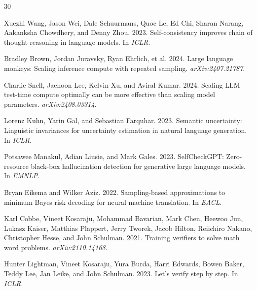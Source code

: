 \documentclass[11pt,a4paper]{article}
\begin{document}
\begin{thebibliography}{30}

Xuezhi Wang, Jason Wei, Dale Schuurmans, Quoc Le, Ed Chi, Sharan Narang, Aakanksha Chowdhery, and Denny Zhou. 2023.
\newblock Self-consistency improves chain of thought reasoning in language models.
\newblock In \emph{ICLR}.

Bradley Brown, Jordan Juravsky, Ryan Ehrlich, et al. 2024.
\newblock Large language monkeys: Scaling inference compute with repeated sampling.
\newblock \emph{arXiv:2407.21787}.

Charlie Snell, Jaehoon Lee, Kelvin Xu, and Aviral Kumar. 2024.
\newblock Scaling LLM test-time compute optimally can be more effective than scaling model parameters.
\newblock \emph{arXiv:2408.03314}.

Lorenz Kuhn, Yarin Gal, and Sebastian Farquhar. 2023.
\newblock Semantic uncertainty: Linguistic invariances for uncertainty estimation in natural language generation.
\newblock In \emph{ICLR}.

Potsawee Manakul, Adian Liusie, and Mark Gales. 2023.
\newblock SelfCheckGPT: Zero-resource black-box hallucination detection for generative large language models.
\newblock In \emph{EMNLP}.

Bryan Eikema and Wilker Aziz. 2022.
\newblock Sampling-based approximations to minimum Bayes risk decoding for neural machine translation.
\newblock In \emph{EACL}.

Karl Cobbe, Vineet Kosaraju, Mohammad Bavarian, Mark Chen, Heewoo Jun, Lukasz Kaiser, Matthias Plappert, Jerry Tworek, Jacob Hilton, Reiichiro Nakano, Christopher Hesse, and John Schulman. 2021.
\newblock Training verifiers to solve math word problems.
\newblock \emph{arXiv:2110.14168}.

Hunter Lightman, Vineet Kosaraju, Yura Burda, Harri Edwards, Bowen Baker, Teddy Lee, Jan Leike, and John Schulman. 2023.
\newblock Let's verify step by step.
\newblock In \emph{ICLR}.


\end{thebibliography}
\end{document}

